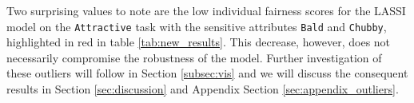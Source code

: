 
Two surprising values to \colorbox{myred}{note} are the low individual fairness scores for the LASSI model on the \texttt{Attractive} task with the sensitive attributes \texttt{Bald} and \texttt{Chubby}, highlighted in red in table \ref{tab:new_results}. This decrease, however, does not necessarily compromise the robustness of the model. Further investigation of these outliers will follow in Section \ref{subsec:vis} and we will discuss the consequent results in Section \ref{sec:discussion} and Appendix Section \ref{sec:appendix_outliers}.



